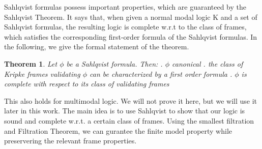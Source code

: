 \documentclass[12pt, a4paper]{scrartcl}
\newtheorem{theorem}[definition]{Theorem}
\begin{document}
Sahlqvist formulas possess important properties, which are guaranteed by the Sahlqvist Theorem. It says that, 
when given a normal modal logic K and a set of Sahlqvist formulas, the resulting logic is complete w.r.t 
to the class of frames, which satisfies the corresponding first-order formula of the Sahlqvist formulas. In the following, we give the formal statement of the theorem.
\begin{theorem}
    Let $\phi$ be a Sahlqvist formula. Then:
    \newline
    . $\phi$ canonical . the class of Kripke frames validating $\phi$ can be characterized by a first order formula . $\phi$ is complete with respect to its class of validating frames

    
\end{theorem}
This also holds for multimodal logic. We will not prove it here, but we will use it later in this work.
The main idea is to use Sahlqvist to show that our logic is sound and complete w.r.t. a certain class of frames. Using the smallest filtration and Filtration Theorem,
we can gurantee the finite model property while preservering the relevant frame properties.

\clearpage
\end{document}
